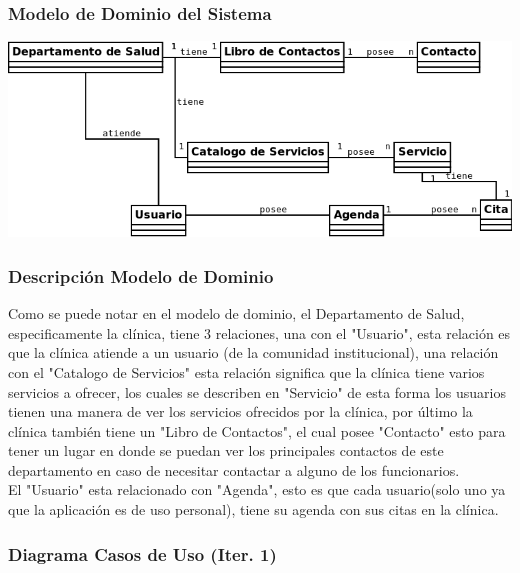 \documentclass[12pt]{article}
\begin{document}
\subsubsection{Modelo de Dominio del Sistema}

\includegraphics[width=\linewidth]{"../Documentos/Diagramas/modelo_dominio"}

\subsubsection{Descripci\'on Modelo de Dominio}

Como se puede notar en el modelo de dominio, el Departamento de Salud, especificamente la cl\'inica, tiene 3 relaciones, una con el "Usuario", esta relaci\'on es que la cl\'inica atiende a un usuario (de la comunidad institucional), una relaci\'on con el "Catalogo de Servicios" esta relaci\'on significa que la cl\'inica tiene varios servicios a ofrecer, los cuales se describen en "Servicio" de esta forma los usuarios tienen una manera de ver los servicios ofrecidos por la cl\'inica, por \'ultimo la cl\'inica tambi\'en tiene un "Libro de Contactos", el cual posee "Contacto" esto para tener un lugar en donde se puedan ver los principales contactos de este departamento en caso de necesitar contactar a alguno de los funcionarios.\\
El "Usuario" esta relacionado con "Agenda", esto es que cada usuario(solo uno ya que la aplicaci\'on es de uso personal), tiene su agenda con sus citas en la cl\'inica.

\subsubsection{Diagrama Casos de Uso (Iter. 1)}
\end{document}

